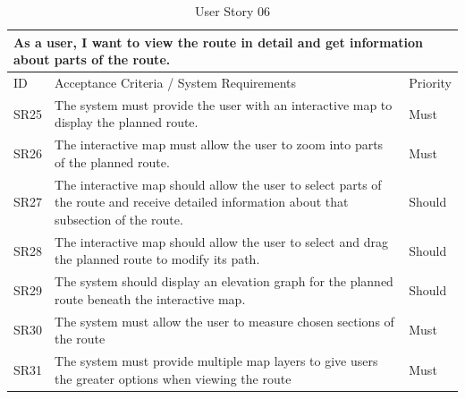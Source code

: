 \begin{table}[!htb]
  \caption{User Story 06}
  \label{tab:user-story-06}
  \begin{tabular}{ m{1cm} m{11cm} m{1cm} }
  \hline
  \multicolumn{3}{p{13cm}}{As a user, I want to view the route in detail and get information about parts of the route.}\\ 
  \hline
  ID & Acceptance Criteria / System Requirements & Priority\\
  \hline
  \label{SR:25}SR25 & The system must provide the user with an interactive map to display the planned route. & Must \\
  \label{SR:26}SR26 & The interactive map must allow the user to zoom into parts of the planned route. & Must\\
  \label{SR:27}SR27 & The interactive map should allow the user to select parts of the route and receive detailed information about that subsection of the route. & Should\\
  \label{SR:28}SR28 & The interactive map should allow the user to select and drag the planned route to modify its path. & Should\\ 
  \label{SR:29}SR29 & The system should display an elevation graph for the planned route beneath the interactive map. & Should\\
  \label{SR:30}SR30 & The system must allow the user to measure chosen sections of the route & Must\\
  \label{SR:31}SR31 & The system must provide multiple map layers to give users the greater options when viewing the route & Must\\ 
  \hline
  \end{tabular}
\end{table}

